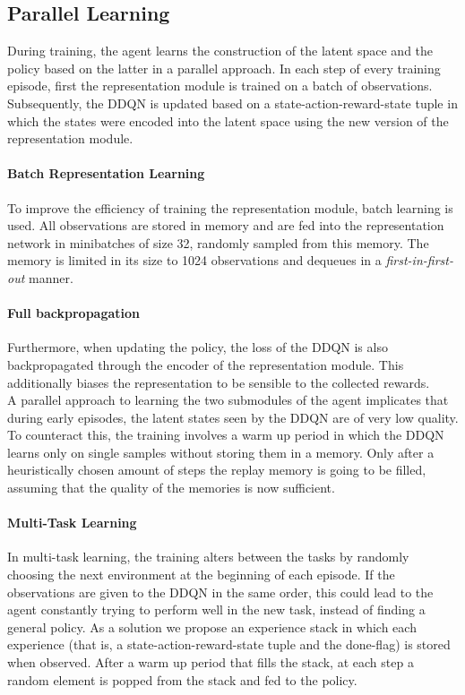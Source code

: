 \subsection{Parallel Learning}
During training, the agent learns the construction of the latent space and the policy based on the latter  in a parallel approach. In each step of every training episode, first the representation module is trained on a batch of observations. Subsequently, the DDQN is updated based on a state-action-reward-state tuple in which the states were encoded into the latent space using the new version of the representation module. 

\paragraph{Batch Representation Learning} To improve the efficiency of training the representation module, batch learning is used. All observations are stored in memory and are fed into the representation network in minibatches of size 32, randomly sampled from this memory. The memory is limited in its size to 1024 observations and dequeues in a \textit{first-in-first-out} manner.

\paragraph{Full backpropagation} Furthermore, when updating the policy, the loss of the DDQN is also backpropagated through the encoder of the representation module. This additionally biases the representation to be sensible to the collected rewards.\\

A parallel approach to learning the two submodules of the agent implicates that during early episodes, the latent states seen by the DDQN are of very low quality. To counteract this, the training involves a warm up period in which the DDQN learns only on single samples without storing them in a memory. Only after a heuristically chosen amount of steps the replay memory is going to be filled, assuming that the quality of the memories is now sufficient.

\paragraph{Multi-Task Learning} In multi-task learning, the training alters between the tasks by randomly choosing the next environment at the beginning of each episode. If the observations are given to the DDQN in the same order, this could lead to the agent constantly trying to perform well in the new task, instead of finding a general policy. As a solution we propose an experience stack in which each experience (that is, a state-action-reward-state tuple and the done-flag) is stored when observed. After a warm up period that fills the stack, at each step a random element is popped from the stack and fed to the policy.


